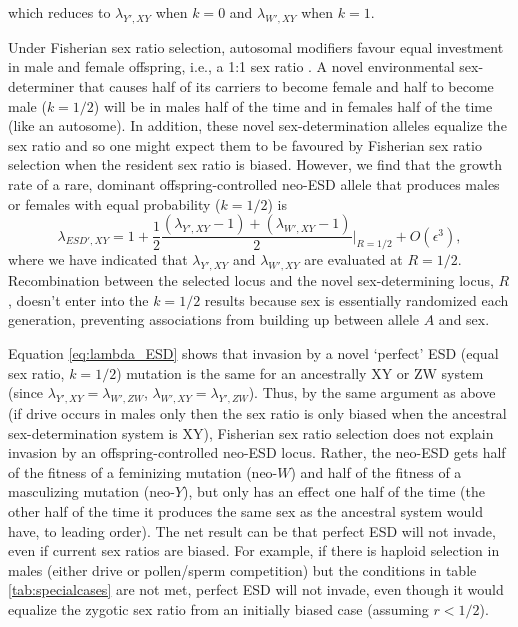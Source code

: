 \documentclass[12pt]{article}
\begin{document}
\noindent
which reduces to $\lambda_{Y',XY}$ when $k=0$ and $\lambda_{W',XY}$ when $k=1$. 

Under Fisherian sex ratio selection, autosomal modifiers favour equal investment in male and female offspring, i.e., a 1:1 sex ratio \citep{Fisher:1930wy,Charnov:1982wg,West:2009we}. 
A novel environmental sex-determiner that causes half of its carriers to become female and half to become male ($k=1/2$) will be in males half of the time and in females half of the time (like an autosome).
In addition, these novel sex-determination alleles equalize the sex ratio and so one might expect them to be favoured by Fisherian sex ratio selection when the resident sex ratio is biased.
However, we find that the growth rate of a rare, dominant offspring-controlled neo-ESD allele that produces males or females with equal probability ($k=1/2$) is
\begin{equation}
\lambda_{ESD',XY} =1+ \frac{1}{2}\frac{(\lambda_{Y',XY}-1) + (\lambda_{W',XY}-1)}{2} \Big|_{R=1/2} + O\left(\epsilon^3\right),
\label{eq:lambda_ESD}
\end{equation}
\noindent
where we have indicated that $\lambda_{Y',XY}$ and $\lambda_{W',XY}$ are evaluated at $R=1/2$.
Recombination between the selected locus and the novel sex-determining locus, $R$, doesn't enter into the $k=1/2$ results because sex is essentially randomized each generation, %
preventing associations from building up between allele $A$ and sex.  

Equation \eqref{eq:lambda_ESD} shows that invasion by a novel `perfect' ESD (equal sex ratio, $k=1/2$) mutation is the same for an ancestrally XY or ZW system (since $\lambda_{Y',XY} = \lambda_{W',ZW}$, $\lambda_{W',XY} = \lambda_{Y',ZW}$).
Thus, by the same argument as above (if drive occurs in males only then the sex ratio is only biased when the ancestral sex-determination system is XY), Fisherian sex ratio selection does not explain invasion by an offspring-controlled neo-ESD locus. 
Rather, the neo-ESD gets half of the fitness of a feminizing mutation (neo-$W$) and half of the fitness of a masculizing mutation (neo-$Y$), but only has an effect one half of the time (the other half of the time it produces the same sex as the ancestral system would have, to leading order). 
The net result can be that perfect ESD will not invade, even if current sex ratios are biased. 
For example, if there is haploid selection in males (either drive or pollen/sperm competition) but the conditions in table \ref{tab:specialcases} are not met, perfect ESD will not invade, even though it would equalize the zygotic sex ratio from an initially biased case (assuming $r<1/2$). 
\end{document}
